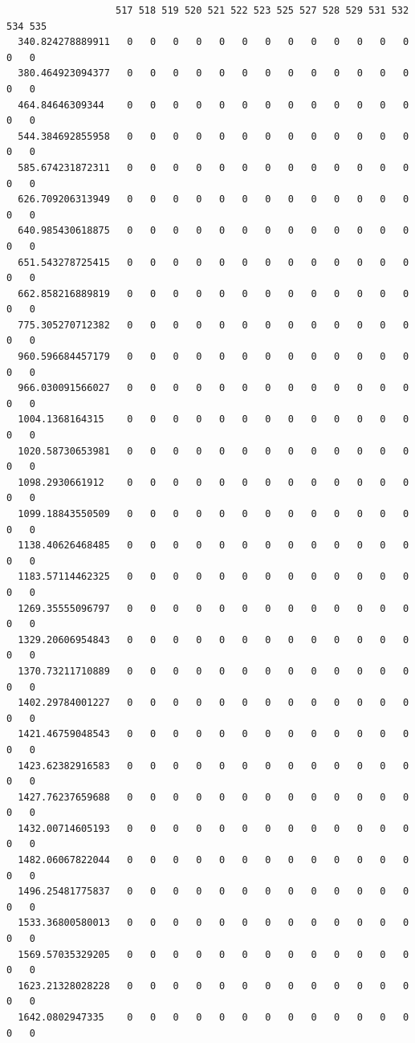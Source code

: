 \documentclass[
  letterpaper,
  DIV=11,
  numbers=noendperiod]{scrartcl}
\begin{document}
\begin{verbatim}
                   517 518 519 520 521 522 523 525 527 528 529 531 532 534 535
  340.824278889911   0   0   0   0   0   0   0   0   0   0   0   0   0   0   0
  380.464923094377   0   0   0   0   0   0   0   0   0   0   0   0   0   0   0
  464.84646309344    0   0   0   0   0   0   0   0   0   0   0   0   0   0   0
  544.384692855958   0   0   0   0   0   0   0   0   0   0   0   0   0   0   0
  585.674231872311   0   0   0   0   0   0   0   0   0   0   0   0   0   0   0
  626.709206313949   0   0   0   0   0   0   0   0   0   0   0   0   0   0   0
  640.985430618875   0   0   0   0   0   0   0   0   0   0   0   0   0   0   0
  651.543278725415   0   0   0   0   0   0   0   0   0   0   0   0   0   0   0
  662.858216889819   0   0   0   0   0   0   0   0   0   0   0   0   0   0   0
  775.305270712382   0   0   0   0   0   0   0   0   0   0   0   0   0   0   0
  960.596684457179   0   0   0   0   0   0   0   0   0   0   0   0   0   0   0
  966.030091566027   0   0   0   0   0   0   0   0   0   0   0   0   0   0   0
  1004.1368164315    0   0   0   0   0   0   0   0   0   0   0   0   0   0   0
  1020.58730653981   0   0   0   0   0   0   0   0   0   0   0   0   0   0   0
  1098.2930661912    0   0   0   0   0   0   0   0   0   0   0   0   0   0   0
  1099.18843550509   0   0   0   0   0   0   0   0   0   0   0   0   0   0   0
  1138.40626468485   0   0   0   0   0   0   0   0   0   0   0   0   0   0   0
  1183.57114462325   0   0   0   0   0   0   0   0   0   0   0   0   0   0   0
  1269.35555096797   0   0   0   0   0   0   0   0   0   0   0   0   0   0   0
  1329.20606954843   0   0   0   0   0   0   0   0   0   0   0   0   0   0   0
  1370.73211710889   0   0   0   0   0   0   0   0   0   0   0   0   0   0   0
  1402.29784001227   0   0   0   0   0   0   0   0   0   0   0   0   0   0   0
  1421.46759048543   0   0   0   0   0   0   0   0   0   0   0   0   0   0   0
  1423.62382916583   0   0   0   0   0   0   0   0   0   0   0   0   0   0   0
  1427.76237659688   0   0   0   0   0   0   0   0   0   0   0   0   0   0   0
  1432.00714605193   0   0   0   0   0   0   0   0   0   0   0   0   0   0   0
  1482.06067822044   0   0   0   0   0   0   0   0   0   0   0   0   0   0   0
  1496.25481775837   0   0   0   0   0   0   0   0   0   0   0   0   0   0   0
  1533.36800580013   0   0   0   0   0   0   0   0   0   0   0   0   0   0   0
  1569.57035329205   0   0   0   0   0   0   0   0   0   0   0   0   0   0   0
  1623.21328028228   0   0   0   0   0   0   0   0   0   0   0   0   0   0   0
  1642.0802947335    0   0   0   0   0   0   0   0   0   0   0   0   0   0   0

\end{verbatim}
\end{document}
